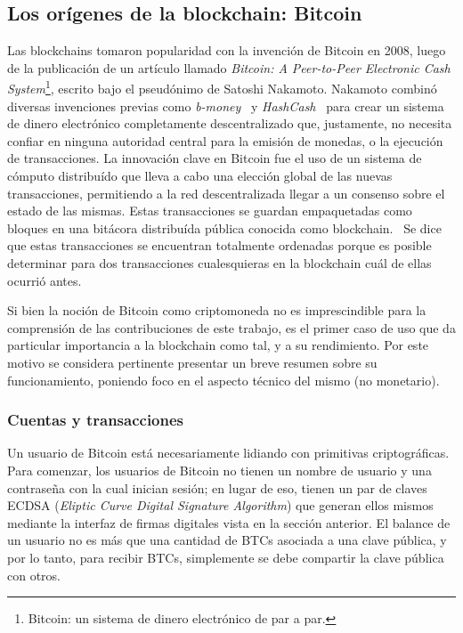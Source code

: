 \subsection{Los orígenes de la blockchain: Bitcoin}
Las blockchains tomaron popularidad con la invención de Bitcoin en 2008, luego de la publicación
de un artículo llamado \textit{Bitcoin: A Peer-to-Peer
Electronic Cash System}\footnote{Bitcoin: un sistema de dinero electrónico de par a par.}, escrito
bajo el pseudónimo de Satoshi Nakamoto.
Nakamoto combinó diversas invenciones previas como
\textit{b-money}~\cite{b.money} y \textit{HashCash}~\cite{hashcash} para crear un sistema de dinero electrónico completamente
descentralizado que, justamente, no necesita confiar en ninguna autoridad central para la emisión de monedas,
o la ejecución de transacciones. 
La innovación clave en Bitcoin fue el uso de un sistema de cómputo distribuído que lleva
a cabo una elección global de las nuevas transacciones, permitiendo
a la red descentralizada llegar a un consenso sobre el estado de las mismas. Estas transacciones
se guardan empaquetadas como bloques en una bitácora distribuída pública conocida como blockchain.~\cite{mastering.bitcoin}
%
Se dice que estas transacciones se encuentran totalmente ordenadas porque es posible determinar para
dos transacciones cualesquieras en la blockchain cuál de ellas ocurrió antes.


%
Si bien la noción de Bitcoin como criptomoneda no es imprescindible para la comprensión de las
contribuciones de este trabajo, es el primer caso de uso que da particular importancia a la blockchain
como tal, y a su rendimiento. Por este motivo se considera pertinente presentar un breve resumen sobre
su funcionamiento, poniendo foco en el aspecto técnico del mismo (no monetario).

\subsubsection{Cuentas y transacciones}

Un usuario de Bitcoin está necesariamente lidiando con primitivas criptográficas.
%
Para comenzar, los usuarios de Bitcoin no tienen un nombre de usuario y una contraseña
con la cual inician sesión; en lugar de eso, tienen un par de claves ECDSA (\textit{Eliptic
Curve Digital Signature Algorithm}) que generan ellos mismos mediante la interfaz de firmas
digitales vista en la sección anterior.
%
El balance de un usuario no es más que una cantidad de BTCs asociada a una clave pública,
y por lo tanto, para recibir BTCs, simplemente se debe compartir la clave pública con otros.

